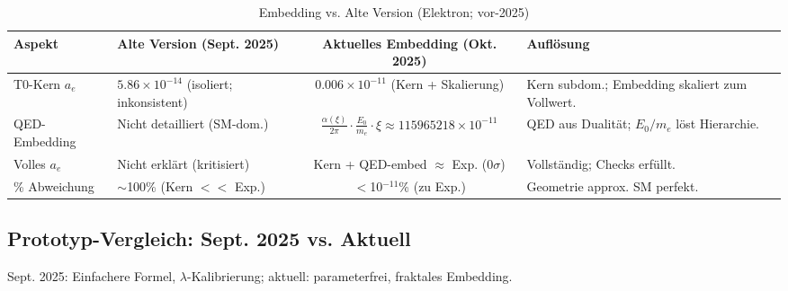 \documentclass[12pt,a4paper]{article}
\begin{document}
	\begin{table}[ht!]
		\centering
		\small
		\begin{adjustbox}{max width=\textwidth}
			\begin{tabular}{llcl}
				\toprule
				Aspekt & Alte Version (Sept. 2025) & Aktuelles Embedding (Okt. 2025) & Auflösung \\
				\midrule
				T0-Kern $a_e$ & $5.86 \times 10^{-14}$ (isoliert; inkonsistent) & $0.006 \times 10^{-11}$ (Kern + Skalierung) & Kern subdom.; Embedding skaliert zum Vollwert. \\
				QED-Embedding & Nicht detailliert (SM-dom.) & $\frac{\alpha(\xi)}{2\pi} \cdot \frac{E_0}{m_e} \cdot \xi \approx 115965218 \times 10^{-11}$ & QED aus Dualität; $E_0 / m_e$ löst Hierarchie. \\
				Volles $a_e$ & Nicht erklärt (kritisiert) & Kern + QED-embed $\approx$ Exp. (0$\sigma$) & Vollständig; Checks erfüllt. \\
				\% Abweichung & $\sim$100\% (Kern $<<$ Exp.) & $<$10$^{-11}$\% (zu Exp.) & Geometrie approx. SM perfekt. \\
				\bottomrule
			\end{tabular}
		\end{adjustbox}
		\caption{Embedding vs. Alte Version (Elektron; vor-2025)}
		\label{tab:embedding_electron}
	\end{table}
	
	\subsection{Prototyp-Vergleich: Sept. 2025 vs. Aktuell}
	
	Sept. 2025: Einfachere Formel, $\lambda$-Kalibrierung; aktuell: parameterfrei, fraktales Embedding.
	
\end{document}
